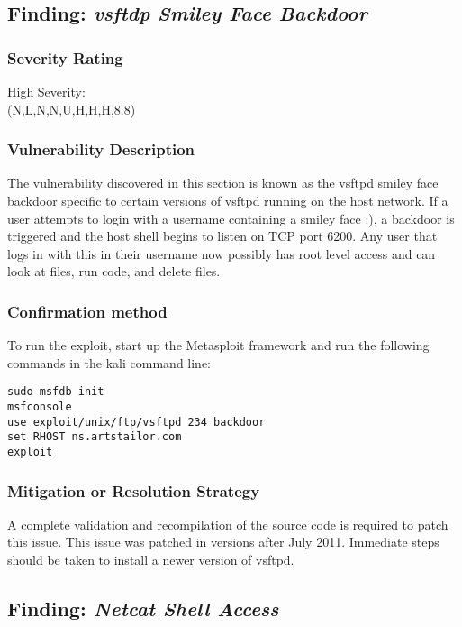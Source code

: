 \documentclass[notitlepage]{article}
\begin{document}

  \subsection{Finding: \emph{vsftdp Smiley Face Backdoor}}
  
	\subsubsection*{Severity Rating}
		High Severity: \\
		\cvss(N,L,N,N,U,H,H,H,8.8)
		
  	\subsubsection*{Vulnerability Description}
  		The vulnerability discovered in this section is known as the vsftpd smiley face backdoor specific to
        certain versions of vsftpd running on the host network. If a user attempts to login with a username containing a smiley
        face :), a backdoor is triggered and the host shell begins to listen on TCP port 6200. Any user that logs in
        with this in their username now possibly has root level access and can look at files, run code, and delete files.

  	\subsubsection*{Confirmation method}
  	    To run the exploit, start up the Metasploit framework and run the following commands in the kali command line:

\begin{verbatim}
sudo msfdb init
msfconsole
use exploit/unix/ftp/vsftpd 234 backdoor
set RHOST ns.artstailor.com
exploit
\end{verbatim}

    \subsubsection*{Mitigation or Resolution Strategy}
        A complete validation and recompilation of the source code is required to patch this issue. This
        issue was patched in versions after July 2011. Immediate steps should be taken to install a newer version
        of vsftpd.



  \subsection{Finding: \emph{Netcat Shell Access}}
  
\end{document}
